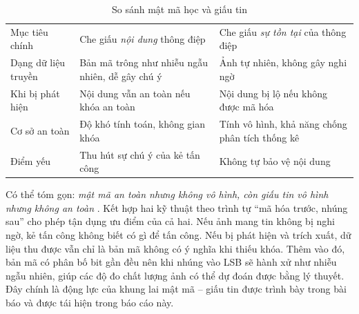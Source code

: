 \begin{table}[H]
\centering
\caption{So sánh mật mã học và giấu tin}
\label{tab:crypto-vs-stego}
\small
\begin{tabularx}{\linewidth}{@{}P{3.4cm}LL@{}}
\toprule
{} &  & \\
\midrule
Mục tiêu chính & Che giấu \emph{nội dung} thông điệp & Che giấu \emph{sự tồn tại} của thông điệp\\
Dạng dữ liệu truyền & Bản mã trông như nhiễu ngẫu nhiên, dễ gây chú ý & Ảnh tự nhiên, không gây nghi ngờ\\
Khi bị phát hiện & Nội dung vẫn an toàn nếu khóa an toàn & Nội dung bị lộ nếu không được mã hóa\\
Cơ sở an toàn & Độ khó tính toán, không gian khóa & Tính vô hình, khả năng chống phân tích thống kê\\
Điểm yếu & Thu hút sự chú ý của kẻ tấn công & Không tự bảo vệ nội dung\\
\bottomrule
\end{tabularx}
\end{table}

Có thể tóm gọn: \emph{mật mã an toàn nhưng không vô hình, còn giấu tin vô hình nhưng không an
toàn} \cite{raut2026hybrid}. Kết hợp hai kỹ thuật theo trình tự ``mã hóa trước, nhúng sau''
cho phép tận dụng ưu điểm của cả hai. Nếu ảnh mang tin không bị nghi ngờ, kẻ tấn công không
biết có gì để tấn công. Nếu bị phát hiện và trích xuất, dữ liệu thu được vẫn chỉ là bản mã
không có ý nghĩa khi thiếu khóa. Thêm vào đó, bản mã có phân bố bit gần đều nên khi nhúng vào
LSB sẽ hành xử như nhiễu ngẫu nhiên, giúp các độ đo chất lượng ảnh có thể dự đoán được bằng
lý thuyết. Đây chính là động lực của khung lai mật mã -- giấu tin được trình bày trong bài
báo và được tái hiện trong báo cáo này.
